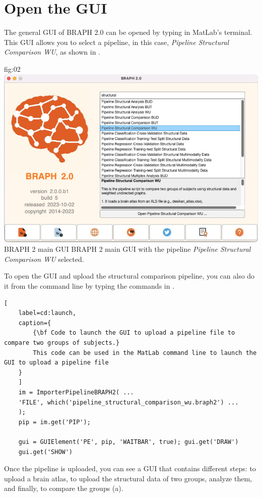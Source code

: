 \documentclass[justified]{tufte-handout}
\begin{document}
\section{Open the GUI}

The general GUI of BRAPH 2.0 can be opened by typing  in MatLab's terminal. This GUI allows you to select a pipeline, in this case, \emph{Pipeline Structural Comparison WU}, as shown in .

{fig:02}
{
	\includegraphics{fig02.jpg}
}
{BRAPH 2 main GUI}
{
	BRAPH 2 main GUI with the pipeline \emph{Pipeline Structural Comparison WU} selected.
}


\begin{tcolorbox}[
	title=Pipeline launch from command line
	]
	To open the GUI and upload the structural comparison pipeline, you can also do it from the command line by typing the commands in .

\begin{lstlisting}[
	label=cd:launch,
	caption={
		{\bf Code to launch the GUI to upload a pipeline file to compare two groups of subjects.}
		This code can be used in the MatLab command line to launch the GUI to upload a pipeline file
	}
	]
	im = ImporterPipelineBRAPH2( ...
	'FILE', which('pipeline_structural_comparison_wu.braph2') ...
	);
	pip = im.get('PIP');
	
	gui = GUIElement('PE', pip, 'WAITBAR', true); gui.get('DRAW')
	gui.get('SHOW')
\end{lstlisting}
\end{tcolorbox}


Once the pipeline is uploaded, you can see a GUI that contains different steps: to upload a brain atlas, to upload the structural data of two groups, analyze them, and finally, to compare the groups (a). 
\end{document}
